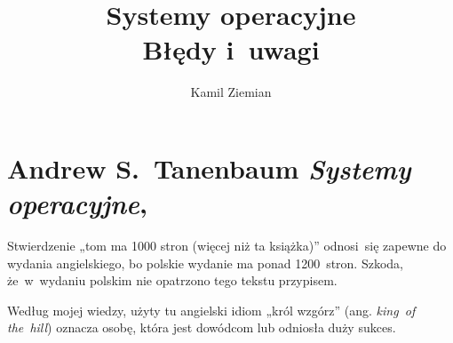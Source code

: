 \documentclass[a4paper,11pt]{article}
\title{Systemy operacyjne \\
  {\Large Błędy i~uwagi}}
\author{Kamil Ziemian \\
  \email}
\numberwithin{equation}{section}
\begin{document}





\maketitle





\section{Andrew S.~Tanenbaum \textit{Systemy operacyjne},
  \parencite{Tanenbaum-Systemy-operacyjne-Wydanie-III-Pub-2013}}

\label{sec:Tanenbaum-Systemy-operacyjne}




\noindent
{} Stwierdzenie „tom ma 1000 stron (więcej niż ta
książka)” odnosi~się zapewne do wydania angielskiego, bo polskie wydanie ma
ponad 1200~stron. Szkoda, że~w~wydaniu polskim nie opatrzono tego tekstu
przypisem.

\VerSpaceFour




\noindent
{} Według mojej wiedzy, użyty tu angielski idiom „król
wzgórz” (ang. \textit{king~of the~hill}) oznacza osobę, która jest dowódcom
lub odniosła duży sukces.






\newpage

\end{document}
